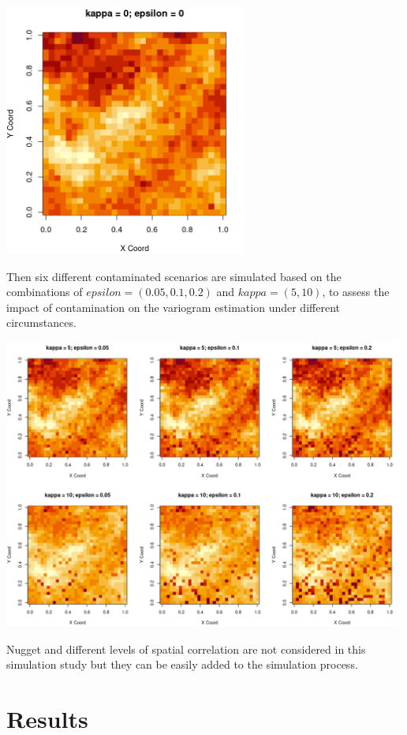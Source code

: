 \documentclass[
  12pt]{article}
\begin{document}
\begin{center}
\includegraphics[width=3.125in,height=\textheight]{img/grf.png}
\end{center}

Then six different contaminated scenarios are simulated based on the
combinations of \(epsilon = (0.05, 0.1, 0.2)\) and \(kappa = (5, 10)\),
to assess the impact of contamination on the variogram estimation under
different circumstances.

\begin{center}
\includegraphics[width=5.20833in,height=\textheight]{img/cgrf.png}
\end{center}

Nugget and different levels of spatial correlation are not considered in
this simulation study but they can be easily added to the simulation
process.

\section{Results}\label{results}
\end{document}
